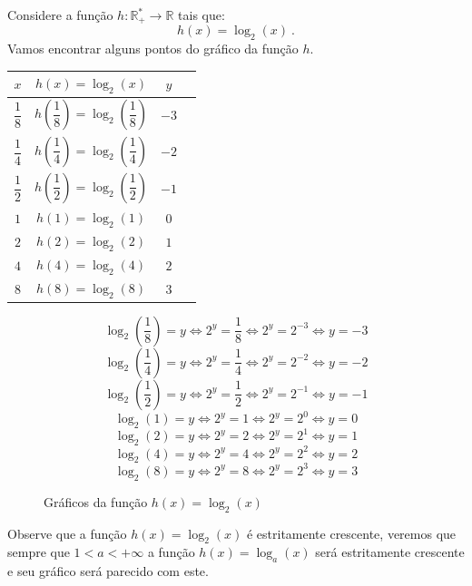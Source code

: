  \begin{exem} \label{ex:log-2}
  Considere a função $h: \mathbb{R_{+}^{*}} \rightarrow \mathbb{R} $ tais que:
 \[h(x) = \log_{2}(x) \ .\]
 Vamos encontrar alguns pontos do gráfico da função $h$.
 
  \begin{table}[H]
 \centering
 \begin{tabular}{|c|c|c|c|} \hline
 \rowcolor{cinza}
 $x$ & $h(x) = \log_{2}(x)$ & $y$ \\ \hline
 $\dfrac{1}{8}$ & $h\left(\dfrac{1}{8}\right)= \log_{2}\left(\dfrac{1}{8}\right)$ & $-3$ \\ \hline
 $\dfrac{1}{4}$ & $h\left(\dfrac{1}{4}\right)= \log_{2}\left(\dfrac{1}{4}\right)$ & $-2$ \\ \hline
 $\dfrac{1}{2}$ & $h\left(\dfrac{1}{2}\right)= \log_{2}\left(\dfrac{1}{2}\right)$ & $-1$ \\ \hline
 $1$ & $h(1)= \log_{2}(1)$ & $0$ \\ \hline
 $2$ & $h(2)= \log_{2}(2)$ & $1$ \\ \hline
 $4$ & $h(4)= \log_{2}(4)$ & $2$ \\ \hline
 $8$ & $h(8)= \log_{2}(8)$ & $3$ \\ \hline
 \end{tabular}
 \end{table}
 
 \[\log_{2}\left(\dfrac{1}{8}\right)= y \Leftrightarrow 2^y= \dfrac{1}{8} \Leftrightarrow 2^y= 2^{-3} \Leftrightarrow y=-3\]
 \[\log_{2}\left(\dfrac{1}{4}\right)= y \Leftrightarrow 2^y= \dfrac{1}{4} \Leftrightarrow 2^y= 2^{-2} \Leftrightarrow y=-2\]
 \[\log_{2}\left(\dfrac{1}{2}\right)= y \Leftrightarrow 2^y= \dfrac{1}{2} \Leftrightarrow 2^y= 2^{-1} \Leftrightarrow y=-1\]
 \[\log_{2}(1)= y \Leftrightarrow 2^y= 1 \Leftrightarrow 2^y= 2^0 \Leftrightarrow y=0\]
 \[\log_{2}(2)= y \Leftrightarrow 2^y= 2 \Leftrightarrow 2^y= 2^1 \Leftrightarrow y=1\]
 \[\log_{2}(4)= y \Leftrightarrow 2^y= 4 \Leftrightarrow 2^y= 2^2 \Leftrightarrow y=2\]
 \[\log_{2}(8)= y \Leftrightarrow 2^y= 8 \Leftrightarrow 2^y= 2^3 \Leftrightarrow y=3\]
 
 \begin{figure}[H]
    \centering
    \caption{Gráficos da função $h(x)= \log_{2}(x)$}
   \end{figure}
 Observe que a função $h(x)= \log_{2}(x)$ é estritamente crescente, veremos que sempre que $1< a < +\infty$ a função $h(x)= \log_{a}(x)$ será estritamente crescente e seu gráfico será parecido com este.
 \end{exem}

